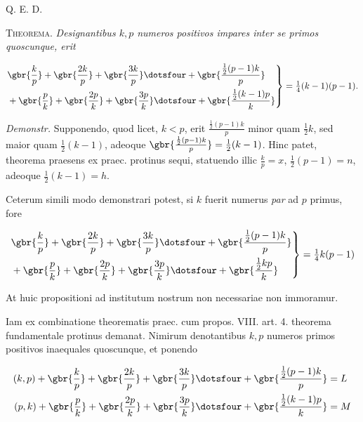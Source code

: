 Q. E. D.


\textsc{Theorema.}  \emph{Designantibus $k,p$ numeros positivos impares inter se primos quoscunque, erit}

\[
\begin{aligned}
\left.\begin{aligned}
&\gbr{\frac kp}+\gbr{\frac{2k}{p}}+\gbr{\frac{3k}{p}}\dotsfour+\gbr{\frac{\frac12(p-1)k}{p}}\\
&+\gbr{\frac pk}+\gbr{\frac{2p}{k}}+\gbr{\frac{3p}{k}}\dotsfour+\gbr{\frac{\frac12(k-1)p}{k}}
\end{aligned}\right\}=\tfrac14(k-1)(p-1).
\end{aligned}
\]

\emph{Demonstr.}  Supponendo, quod licet, $k<p$, erit $\frac{\frac12(p-1)k}{p}$ minor quam $\frac12 k$, sed maior quam $\frac12(k-1)$, adeoque $\gbr{\frac{\frac12(p-1)k}{p}}=\frac12(k-1)$.  Hinc patet, theorema praesens ex praec. protinus sequi, statuendo illic $\frac kp=x$, $\frac12(p-1)=n$, adeoque $\frac12(k-1)=h$.

Ceterum simili modo demonstrari potest, si $k$ fuerit numerus \emph{par} ad $p$ primus, fore

\[
\begin{aligned}
\left.\begin{aligned}
&\gbr{\frac kp}+\gbr{\frac{2k}{p}}+\gbr{\frac{3k}{p}}\dotsfour+\gbr{\frac{\frac12(p-1)k}{p}}\\
&+\gbr{\frac pk}+\gbr{\frac{2p}{k}}+\gbr{\frac{3p}{k}}\dotsfour+\gbr{\frac{\frac12 kp}{k}}
\end{aligned}\right\}=\tfrac14 k(p-1)
\end{aligned}
\]

At huic propositioni ad institutum nostrum non necessariae non immoramur.


Iam ex combinatione theorematis praec. cum propos. VIII. art. 4. theorema fundamentale protinus demanat.  Nimirum denotantibus $k,p$ numeros primos positivos inaequales quoscunque, et ponendo

\[
\begin{aligned}
(k,p)+\gbr{\frac kp}+\gbr{\frac{2k}{p}}+\gbr{\frac{3k}{p}}\dotsfour+\gbr{\frac{\frac12(p-1)k}{p}}&=L\\
(p,k)+\gbr{\frac pk}+\gbr{\frac{2p}{k}}+\gbr{\frac{3p}{k}}\dotsfour+\gbr{\frac{\frac12(k-1)p}{k}}&=M
\end{aligned}
\]

